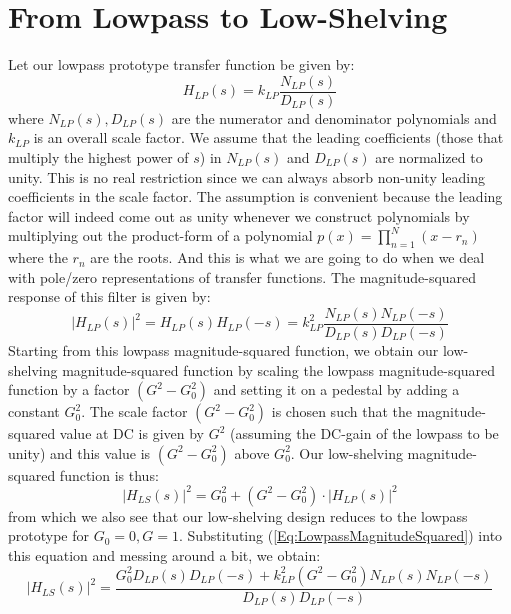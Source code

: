 \section{From Lowpass to Low-Shelving}
Let our lowpass prototype transfer function be given by:
\begin{equation}
\label{Eq:LowpassTransfer}
H_{LP}(s) = k_{LP} \frac{N_{LP}(s)}{D_{LP}(s)}
\end{equation}
where $N_{LP}(s), D_{LP}(s)$ are the numerator and denominator polynomials and $k_{LP}$ is an overall scale factor. We assume that the leading coefficients (those that multiply the highest power of $s$) in $N_{LP}(s)$ and $D_{LP}(s)$ are normalized to unity. This is no real restriction since we can always absorb non-unity leading coefficients in the scale factor. The assumption is convenient because the leading factor will indeed come out as unity whenever we construct polynomials by multiplying out the product-form of a polynomial $p(x) = \prod_{n=1}^N (x - r_n)$ where the $r_n$ are the roots. And this is what we are going to do when we deal with pole/zero representations of transfer functions. The magnitude-squared response of this filter is given by:
\begin{equation}
\label{Eq:LowpassMagnitudeSquared}
|H_{LP}(s)|^2 = H_{LP}(s)H_{LP}(-s)  = k_{LP}^2 \frac{N_{LP}(s) N_{LP}(-s)}{D_{LP}(s) D_{LP}(-s)}
\end{equation}
Starting from this lowpass magnitude-squared function, we obtain our low-shelving magnitude-squared function by scaling the lowpass magnitude-squared function by a factor $(G^2-G_0^2)$ and setting it on a pedestal by adding a constant $G_0^2$. The scale factor $(G^2-G_0^2)$ is chosen such that the magnitude-squared value at DC is given by $G^2$ (assuming the DC-gain of the lowpass to be unity) and this value is $(G^2-G_0^2)$ above $G_0^2$. Our low-shelving magnitude-squared function is thus:
\begin{equation}
\label{Eq:LowshelfMagnitudeSquared1}
|H_{LS}(s)|^2 = G_0^2 + (G^2-G_0^2) \cdot |H_{LP}(s)|^2
\end{equation}
from which we also see that our low-shelving design reduces to the lowpass prototype for $G_0 = 0, G = 1$. Substituting (\ref{Eq:LowpassMagnitudeSquared}) into this equation and messing around a bit, we obtain:
\begin{equation}
\label{Eq:LowshelfMagnitudeSquared}
|H_{LS}(s)|^2 = \frac{G_0^2 D_{LP}(s) D_{LP}(-s) + k_{LP}^2(G^2-G_0^2)N_{LP}(s) N_{LP}(-s)}{D_{LP}(s) D_{LP}(-s)}
\end{equation}
